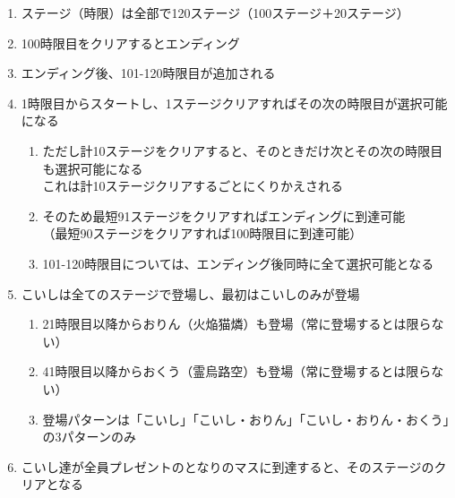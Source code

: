 \clearpage
\begin{enumerate}[label={\sarrow}]
\item ステージ（時限）は全部で120ステージ（100ステージ＋20ステージ）
\item 100時限目をクリアするとエンディング
\item エンディング後、101-120時限目が追加される
\item 1時限目からスタートし、1ステージクリアすればその次の時限目が選択可能になる
  \begin{enumerate}[label={\sarrow}]
  \item ただし計10ステージをクリアすると、そのときだけ次とその次の時限目も選択可能になる\\
        これは計10ステージクリアするごとにくりかえされる
  \item そのため最短91ステージをクリアすればエンディングに到達可能\\
        （最短90ステージをクリアすれば100時限目に到達可能）
  \item 101-120時限目については、エンディング後同時に全て選択可能となる
  \end{enumerate}
\item こいしは全てのステージで登場し、最初はこいしのみが登場
  \begin{enumerate}[label={\sarrow}]
  \item 21時限目以降からおりん（火焔猫燐）も登場（常に登場するとは限らない）
  \item 41時限目以降からおくう（霊烏路空）も登場（常に登場するとは限らない）
  \item 登場パターンは「こいし」「こいし・おりん」「こいし・おりん・おくう」の3パターンのみ
  \end{enumerate}
\item こいし達が全員プレゼントのとなりのマスに到達すると、そのステージのクリアとなる
\end{enumerate}






